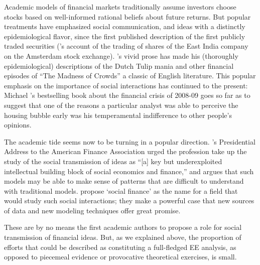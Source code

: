Academic models of financial markets traditionally assume investors choose stocks based on well-informed rational beliefs about future returns.  But popular treatments have emphasized social communication, and ideas with a distinctly epidemiological flavor, since the first published description of  the first publicly traded securities (\cite{vegaConfusion}'s account of the trading of shares of the East India company on the Amsterdam stock exchange).  \cite{mackay1850memoirs}'s vivid prose has made his (thoroughly epidemiological) descriptions of the Dutch Tulip mania and other financial episodes of ``The Madness of Crowds'' a classic of English literature.  This popular emphasis on the importance of social interactions has continued to the present: Michael \cite{lewis2011big}'s bestselling book about the financial crisis of 2008-09 goes so far as to suggest that one of the reasons a particular analyst was able to perceive the housing bubble early was his temperamental indifference to other people's opinions.


The academic tide seems now to be turning in a popular direction. \cite{hirshleifer2020presidential}'s Presidential Address to the American Finance Association urged the profession take up the study of the social transmission of ideas as ``[a] key but underexploited intellectual building block of social economics and finance,'' and argues that such models may be able to make sense of patterns that are difficult to understand with traditional models.  \cite{kuchler2021social} propose `social finance' as the name for a field that would study such social interactions; they make a powerful case that new sources of data and new modeling techniques offer great promise.

These are by no means the first academic authors to propose a role for social transmission of financial ideas.  But, as we explained above, the proportion of efforts that could be described as constituting a full-fledged EE analysis, as opposed to piecemeal evidence or provocative theoretical exercises, is small. %

